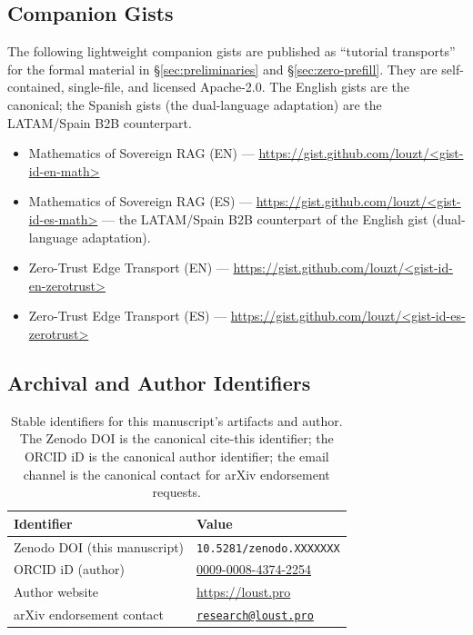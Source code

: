 \subsection{Companion Gists}

The following lightweight companion gists are published as
``tutorial transports'' for the formal material in
\S\ref{sec:preliminaries} and \S\ref{sec:zero-prefill}. They are
self-contained, single-file, and licensed Apache-2.0. The English
gists are the canonical; the Spanish gists (the dual-language adaptation) are
the LATAM/Spain B2B counterpart.

\begin{itemize}
\item Mathematics of Sovereign RAG (EN) ---
  \url{https://gist.github.com/louzt/<gist-id-en-math>}
\item Mathematics of Sovereign RAG (ES) ---
  \url{https://gist.github.com/louzt/<gist-id-es-math>}
  --- the LATAM/Spain B2B counterpart of the English gist
  (dual-language adaptation).
\item Zero-Trust Edge Transport (EN) ---
  \url{https://gist.github.com/louzt/<gist-id-en-zerotrust>}
\item Zero-Trust Edge Transport (ES) ---
  \url{https://gist.github.com/louzt/<gist-id-es-zerotrust>}
\end{itemize}

\subsection{Archival and Author Identifiers}

\begin{table}[h]
\centering
\caption{Stable identifiers for this manuscript's artifacts and
author. The Zenodo DOI is the canonical cite-this identifier; the
ORCID iD is the canonical author identifier; the email channel is
the canonical contact for arXiv endorsement requests.}
\label{tab:archival-identifiers}
\vspace{2pt}
\begin{tabular}{@{}ll@{}}
\toprule
Identifier & Value \\
\midrule
Zenodo DOI (this manuscript) & \texttt{10.5281/zenodo.XXXXXXX} \\
ORCID iD (author) & \href{https://orcid.org/0009-0008-4374-2254}{0009-0008-4374-2254} \\
Author website & \url{https://loust.pro} \\
arXiv endorsement contact & \href{mailto:research@loust.pro}{\texttt{research@loust.pro}} \\
\bottomrule
\end{tabular}
\end{table}

